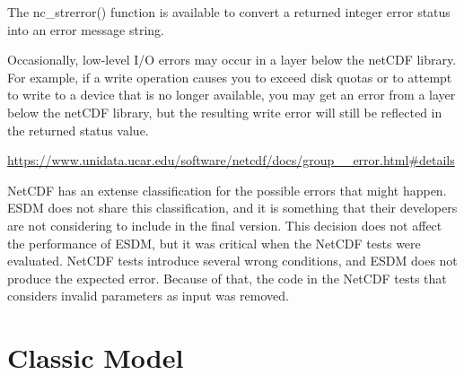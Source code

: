 \begin{framed}
The nc\_strerror() function is available to convert a returned integer error status into an error message string.

Occasionally, low-level I/O errors may occur in a layer below the netCDF library. For example, if a write operation causes you to exceed disk quotas or to attempt to write to a device that is no longer available, you may get an error from a layer below the netCDF library, but the resulting write error will still be reflected in the returned status value.

\url{https://www.unidata.ucar.edu/software/netcdf/docs/group__error.html#details}

\end{framed}

NetCDF has an extense classification for the possible errors that might happen. ESDM does not share this classification, and it is something that their developers are not considering to include in the final version. This decision does not affect the performance of ESDM, but it was critical when the NetCDF tests were evaluated. NetCDF tests introduce several wrong conditions, and ESDM does not produce the expected error. Because of that, the code in the NetCDF tests that considers invalid parameters as input was removed.

\section{Classic Model}

